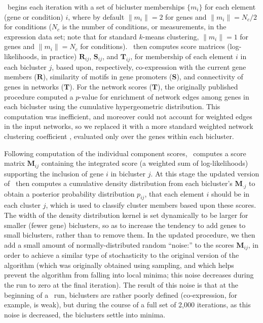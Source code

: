 \cm\ begins each iteration with a set of bicluster memberships
$\{m_i\}$ for each element (gene or condition) $i$, where by default
$\|m_i\| = 2$ for genes and $\|m_i\| = N_c/2$ for conditions ($N_c$ is
the number of conditions, or measurements, in the expression data set;
note that for standard $k$-means clustering, $\|m_i\| = 1$ for genes
and $\|m_i\| = N_c$ for conditions). \cm\ then computes score matrices
(log-likelihoods, in practice) $\mathbf{R}_{ij}$, $\mathbf{S}_{ij}$,
and $\mathbf{T}_{ij}$, for membership of each element $i$ in each
bicluster $j$, based upon, respectively, co-expression with the
current gene members ($\mathbf{R}$), similarity of motifs in gene
promoters ($\mathbf{S}$), and connectivity of genes in networks
($\mathbf{T}$). For the network scores ($\mathbf{T}$), the originally
published procedure \cite{Reiss2006n} computed a $p$-value for
enrichment of network edges among genes in each bicluster using the
cumulative hypergeometric distribution. This computation was
inefficient, and moreover could not account for weighted edges in the
input networks, so we replaced it with a more standard weighted
network clustering coefficient \cite{Watts1998}, evaluated only over
the genes within each bicluster.

Following computation of the individual component scores,
\cm\ computes a score matrix $\mathbf{M}_{ij}$ containing the
integrated score (a weighted sum of log-likelihoods) supporting the
inclusion of gene $i$ in bicluster $j$. At this stage the updated
version of \cm\ then computes a cumulative density distribution from
each bicluster's $\mathbf{M}_{\cdot j}$ to obtain a posterior
probability distribution $p_{ij}$, that each element $i$ should be in
each cluster $j$, which is used to classify cluster members based upon
these scores. The width of the density distribution kernel is set
dynamically to be larger for smaller (fewer gene) biclusters, so as to
increase the tendency to add genes to small biclusters, rather than to
remove them. In the updated procedure, we then add a small amount of
normally-distributed random ``noise:'' to the scores
$\mathbf{M}_{ij}$, in order to achieve a similar type of stochasticity
to the original version of the algorithm (which was originally
obtained using sampling, and which helps prevent the algorithm from
falling into local minima; this noise decreases during the run to zero
at the final iteration). The result of this noise is that at the
beginning of a \cm\ run, biclusters are rather poorly defined
(co-expression, for example, is weak), but during the course of a full
set of 2,000 iterations, as this noise is decreased, the biclusters
settle into minima.


